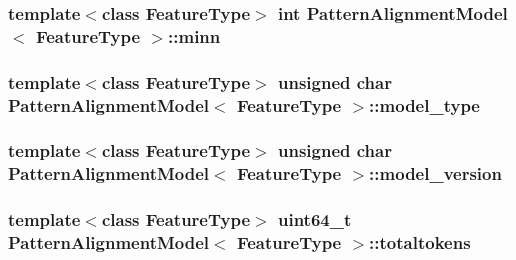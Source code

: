 \subsubsection[{minn}]{\setlength{\rightskip}{0pt plus 5cm}template$<$class Feature\+Type$>$ int {\bf Pattern\+Alignment\+Model}$<$ Feature\+Type $>$\+::minn\hspace{0.3cm}{\ttfamily [protected]}}\label{classPatternAlignmentModel_a9d844ce6aeb1956b8f7c36e9df05ea17}
\hypertarget{classPatternAlignmentModel_a7f24c75a6674ae6bbe70b9fd36286562}{}
\subsubsection[{model\+\_\+type}]{\setlength{\rightskip}{0pt plus 5cm}template$<$class Feature\+Type$>$ unsigned char {\bf Pattern\+Alignment\+Model}$<$ Feature\+Type $>$\+::model\+\_\+type\hspace{0.3cm}{\ttfamily [protected]}}\label{classPatternAlignmentModel_a7f24c75a6674ae6bbe70b9fd36286562}
\hypertarget{classPatternAlignmentModel_ae697eaef720c1ba038fe444b6a7eccd5}{}
\subsubsection[{model\+\_\+version}]{\setlength{\rightskip}{0pt plus 5cm}template$<$class Feature\+Type$>$ unsigned char {\bf Pattern\+Alignment\+Model}$<$ Feature\+Type $>$\+::model\+\_\+version\hspace{0.3cm}{\ttfamily [protected]}}\label{classPatternAlignmentModel_ae697eaef720c1ba038fe444b6a7eccd5}
\hypertarget{classPatternAlignmentModel_ad346131805c2e639a0e223db07ba869a}{}
\subsubsection[{totaltokens}]{\setlength{\rightskip}{0pt plus 5cm}template$<$class Feature\+Type$>$ uint64\+\_\+t {\bf Pattern\+Alignment\+Model}$<$ Feature\+Type $>$\+::totaltokens\hspace{0.3cm}{\ttfamily [protected]}}\label{classPatternAlignmentModel_ad346131805c2e639a0e223db07ba869a}
\hypertarget{classPatternAlignmentModel_a36279cac113c61b57f4a95df6e0a07b7}{}
